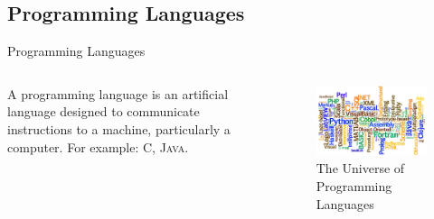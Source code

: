 \documentclass[hideothersubsections, t, aspectratio=1610]{beamer}
\begin{document}
\subsection{Programming Languages}
\begin{frame}{Programming Languages}
\begin{columns}[T]
    \begin{column}{.4\textwidth}
     \begin{block}{}
A programming language is an artificial language designed to communicate
instructions to a machine, particularly a computer. 
For example: \textsc{C}, \textsc{Java}.
    \end{block}
    \end{column}
    \begin{column}{.6\textwidth}
    \begin{block}{}
\begin{figure}[H]
    \includegraphics[width=1\textwidth]{progLanguages.jpg}
    
    \caption{The Universe of Programming Languages}
 \end{figure}   
    \end{block}
    \end{column}
  \end{columns}
\end{frame}
\end{document}
